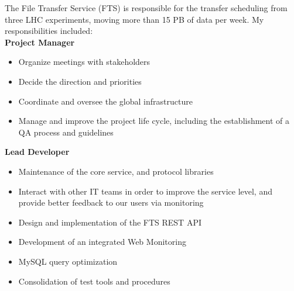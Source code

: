 \documentclass[11pt,a4paper]{moderncv}
\begin{document}
{
  The File Transfer Service (FTS) is responsible for the transfer scheduling from
  three LHC experiments, moving more than 15 PB of data per week. 
  My responsibilities included:\\
  \textbf{Project Manager}
  \begin{itemize}
    \item Organize meetings with stakeholders
    \item Decide the direction and priorities
    \item Coordinate and oversee the global infrastructure
    \item Manage and improve the project life cycle, including the establishment
      of a QA process and guidelines
  \end{itemize}
  \textbf{Lead Developer}
  \begin{itemize}
    \item Maintenance of the core service, and protocol libraries
    \item Interact with other IT teams in order to
      improve the service level, and provide better feedback to our users via monitoring
  \end{itemize}
}

{
  \begin{itemize}
    \item Design and implementation of the FTS REST API
    \item Development of an integrated Web Monitoring
    \item MySQL query optimization
    \item Consolidation of test tools and procedures
  \end{itemize}
}
\end{document}
